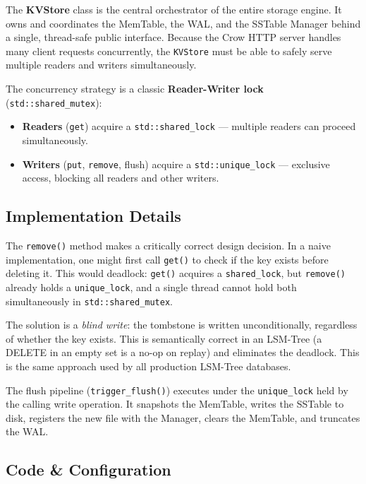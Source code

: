 \documentclass[11pt,a4paper]{article}
\begin{document}
The \textbf{KVStore} class is the central orchestrator of the entire storage
engine. It owns and coordinates the MemTable, the WAL, and the SSTable Manager
behind a single, thread-safe public interface. Because the Crow HTTP server
handles many client requests concurrently, the \texttt{KVStore} must be able
to safely serve multiple readers and writers simultaneously.

The concurrency strategy is a classic \textbf{Reader-Writer lock}
(\texttt{std::shared\_mutex}):
\begin{itemize}[noitemsep]
    \item \textbf{Readers} (\texttt{get}) acquire a \texttt{std::shared\_lock} --- multiple readers can proceed simultaneously.
    \item \textbf{Writers} (\texttt{put}, \texttt{remove}, flush) acquire a \texttt{std::unique\_lock} --- exclusive access, blocking all readers and other writers.
\end{itemize}

\subsection{Implementation Details}

The \texttt{remove()} method makes a critically correct design decision. In a
naive implementation, one might first call \texttt{get()} to check if the key
exists before deleting it. This would deadlock: \texttt{get()} acquires a
\texttt{shared\_lock}, but \texttt{remove()} already holds a
\texttt{unique\_lock}, and a single thread cannot hold both simultaneously in
\texttt{std::shared\_mutex}.

The solution is a \emph{blind write}: the tombstone is written unconditionally,
regardless of whether the key exists. This is semantically correct in an
LSM-Tree (a DELETE in an empty set is a no-op on replay) and eliminates the
deadlock. This is the same approach used by all production LSM-Tree databases.

The flush pipeline (\texttt{trigger\_flush()}) executes under the
\texttt{unique\_lock} held by the calling write operation. It snapshots the
MemTable, writes the SSTable to disk, registers the new file with the Manager,
clears the MemTable, and truncates the WAL.

\subsection{Code \& Configuration}
\end{document}
